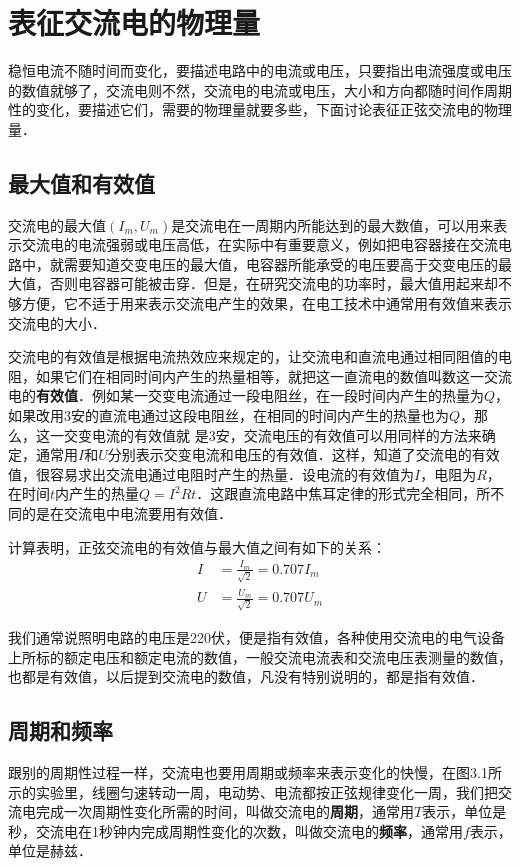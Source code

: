 \section{表征交流电的物理量}

稳恒电流不随时间而变化，要描述电路中的电流或电压，只要指出电流强度或电压的数值就够了，交流电则不然，交流电的电流或电压，大小和方向都随时间作周期性的变化，要描述它们，需要的物理量就要多些，下面讨论表征正弦交流电的物理量．

\subsection{最大值和有效值}

交流电的最大值$(I_m,U_m)$是交流电在一周期内所能达到的最大数值，可以用来表示交流电的电流强弱或电压高低，在实际中有重要意义，例如把电容器接在交流电路中，就需要知道交变电压的最大值，电容器所能承受的电压要高于交变电压的最大值，否则电容器可能被击穿．但是，在研究交流电的功率时，最大值用起来却不够方便，它不适于用来表示交流电产生的效果，在电工技术中通常用有效值来表示交流电的大小．

交流电的有效值是根据电流热效应来规定的，让交流电和直流电通过相同阻值的电阻，如果它们在相同时间内产生的热量相等，就把这一直流电的数值叫数这一交流电的\textbf{有效值}．例如某一交变电流通过一段电阻丝，在一段时间内产生的热量为$Q$，如果改用3安的直流电通过这段电阻丝，在相同的时间内产生的热量也为$Q$，那么，这一交变电流的有效值就
是3安，交流电压的有效值可以用同样的方法来确定，通常用$I$和$U$分别表示交变电流和电压的有效值．这样，知道了交流电的有效值，很容易求出交流电通过电阻时产生的热量．设电流的有效值为$I$，电阻为$R$，在时间$t$内产生的热量$Q=I^2Rt$．这跟直流电路中焦耳定律的形式完全相同，所不同的是在交流电中电流要用有效值．

计算表明，正弦交流电的有效值与最大值之间有如下的关系：
\[\begin{split}
   I&=\frac{I_m}{\sqrt{2}}=0.707I_m\\
   U&=\frac{U_m}{\sqrt{2}}=0.707U_m 
\end{split}\]

我们通常说照明电路的电压是220伏，便是指有效值，各种使用交流电的电气设备上所标的额定电压和额定电流的数值，一般交流电流表和交流电压表测量的数值，也都是有效值，以后提到交流电的数值，凡没有特别说明的，都是指有效值．

\subsection{周期和频率}

跟别的周期性过程一样，交流电也要用周期或频率来表示变化的快慢，在图3.1所示的实验里，线圈匀速转动一周，电动势、电流都按正弦规律变化一周，我们把交流电完成一次周期性变化所需的时间，叫做交流电的\textbf{周期}，通常用$T$表示，单位是秒，交流电在1秒钟内完成周期性变化的次数，叫做交流电的\textbf{频率}，通常用$f$表示，单位是赫兹．

